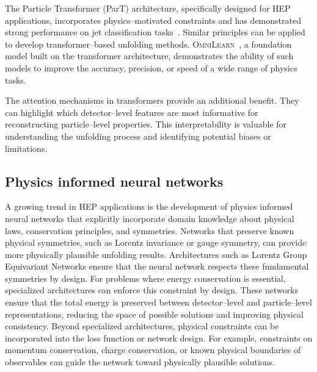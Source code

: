     The Particle Transformer (ParT) architecture,\cite{Qu2022ParticleTagging} specifically designed for HEP applications, incorporates physics--motivated constraints and has demonstrated strong performance on jet classification tasks~\cite{Araz2025GraphLHC}.
    Similar principles can be applied to develop transformer--based unfolding methods.
    \textsc{OmniLearn}~\cite{Mikuni2025MethodTasks}, a foundation model built on the transformer architecture, demonstrates the ability of such models to improve the accuracy, precision, or speed of a wide range of physics tasks.

    The attention mechanisms in transformers provide an additional benefit.
    They can highlight which detector--level features are most informative for reconstructing particle--level properties.
    This interpretability is valuable for understanding the unfolding process and identifying potential biases or limitations.
\subsection{Physics informed neural networks}
    A growing trend in HEP applications is the development of physics informed neural networks that explicitly incorporate domain knowledge about physical laws, conservation principles, and symmetries.
    Networks that preserve known physical symmetries, such as Lorentz invariance or gauge symmetry, can provide more physically plausible unfolding results.
    Architectures such as Lorentz Group Equivariant Networks\cite{Bogatskiy2020LorentzPhysics} ensure that the neural network respects these fundamental symmetries by design.
    For problems where energy conservation is essential, specialized architectures can enforce this constraint by design.
    These networks ensure that the total energy is preserved between detector--level and particle--level representations, reducing the space of possible solutions and improving physical consistency.
    Beyond specialized architectures, physical constraints can be incorporated into the loss function or network design.
    For example, constraints on momentum conservation, charge conservation, or known physical boundaries of observables can guide the network toward physically plausible solutions.

